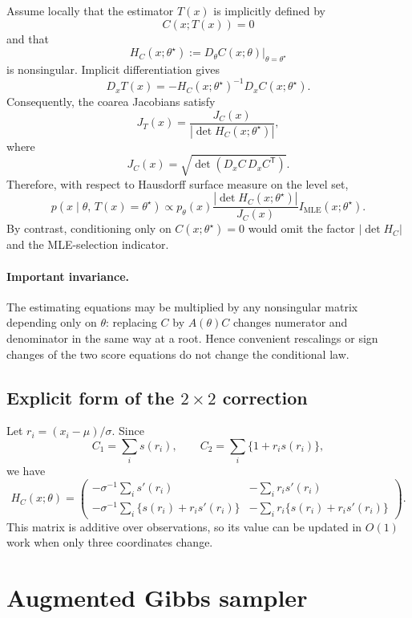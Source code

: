 \documentclass[11pt]{article}
\newcommand{\1}{\mathbf{1}}
\newcommand{\MLE}{\mathrm{MLE}}
\begin{document}
Assume locally that the estimator $T(x)$ is implicitly defined by
\[
    C(x;T(x))=0
\]
and that
\[
    H_C(x;\theta^\star)
    :=D_\theta C(x;\theta)\big|_{\theta=\theta^\star}
\]
is nonsingular.  Implicit differentiation gives
\[
    D_xT(x)
    =-H_C(x;\theta^\star)^{-1}
      D_xC(x;\theta^\star).
\]
Consequently, the coarea Jacobians satisfy
\[
    J_T(x)
    =\frac{J_C(x)}{|\det H_C(x;\theta^\star)|},
\]
where
\[
    J_C(x)
    =\sqrt{\det\!\left(D_xC\,D_xC^\mathsf T\right)}.
\]
Therefore, with respect to Hausdorff surface measure on the level set,
\begin{equation}
\boxed{
    p(x\mid \theta,\,T(x)=\theta^\star)
    \propto
    p_\theta(x)
    \frac{|\det H_C(x;\theta^\star)|}{J_C(x)}
    I_{\MLE}(x;\theta^\star).
}
\label{eq:exact-mle-manifold-target}
\end{equation}
By contrast, conditioning only on $C(x;\theta^\star)=0$ would omit the factor
$|\det H_C|$ and the MLE-selection indicator.

\paragraph{Important invariance.}
The estimating equations may be multiplied by any nonsingular matrix depending only on $\theta$: replacing $C$ by $A(\theta)C$ changes numerator and denominator in the same way at a root.  Hence convenient rescalings or sign changes of the two score equations do not change the conditional law.

\subsection{Explicit form of the $2\times2$ correction}

Let $r_i=(x_i-\mu)/\sigma$.  Since
\[
    C_1=\sum_i s(r_i),
    \qquad
    C_2=\sum_i \{1+r_i s(r_i)\},
\]
we have
\begin{equation}
\boxed{
H_C(x;\theta)
=
\begin{pmatrix}
-\sigma^{-1}\sum_i s'(r_i)
& -\sum_i r_i s'(r_i)\\[4pt]
-\sigma^{-1}\sum_i \{s(r_i)+r_i s'(r_i)\}
& -\sum_i r_i\{s(r_i)+r_i s'(r_i)\}
\end{pmatrix}.
}
\label{eq:generic-H}
\end{equation}
This matrix is additive over observations, so its value can be updated in $O(1)$ work when only three coordinates change.

\section{Augmented Gibbs sampler}
\end{document}
